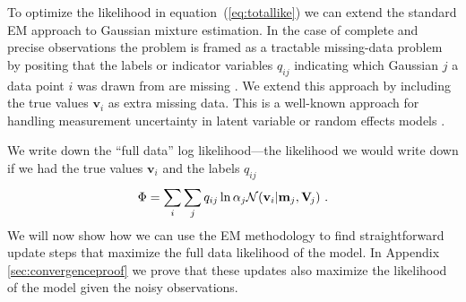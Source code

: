 \documentclass[aoas,preprint,authoryear,round]{imsart}
\newcommand{\eqnnumber}{equation}
\newcommand{\eg}{e.g.}
\newcommand{\normal}{{\cal N}}
\renewcommand{\vec}[1]{\mathbf{#1}} %
\newcommand{\mm}{\vec{m}}
\newcommand{\vv}{\vec{v}}
\newcommand{\mmj}{\mm_j}
\newcommand{\vvi}{\vv_i}
\newcommand{\ten}[1]{\mathbf{#1}} %
\newcommand{\VV}{\ten{V}}
\newcommand{\VVj}{\VV_{\!j}} %
\newcommand{\qij}{q_{ij}}
\begin{document}
To optimize the likelihood in \eqnnumber~(\ref{eq:totallike}) we can
extend the standard EM approach to Gaussian mixture estimation. In the
case of complete and precise observations the problem is framed as a
tractable missing-data problem by positing that the labels or
indicator variables $\qij$ indicating which Gaussian $j$ a data point
$i$ was drawn from are missing \citep{Dempster1977}. We extend this
approach by including the true values $\vvi$ as extra missing
data. This is a well-known approach for handling measurement
uncertainty in latent variable or random effects models
\citep[\eg][]{Schafer93a,Schafer96a}.

We write down the ``full data'' log likelihood---the likelihood we
would write down if we had the true values $\vvi$ and the labels
$\qij$
\begin{equation}\label{eq:incompletefulllike}
\Phi = \sum_i \sum_j \qij \ln \alpha_j \normal(\vvi|\mmj,\VVj) \ .
\end{equation}
We will now show how we can use the EM methodology to find
straightforward update steps that maximize the full data likelihood of
the model. In Appendix \ref{sec:convergenceproof} we prove that these
updates also maximize the likelihood of the model given the noisy
observations.
\end{document}
